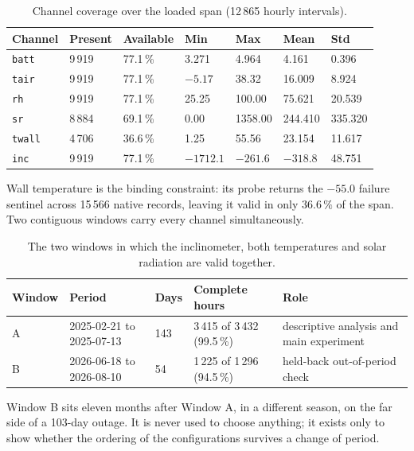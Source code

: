 \documentclass[11pt,a4paper]{article}
\begin{document}
\begin{table}[H]
\centering
\caption{Channel coverage over the loaded span (12\,865 hourly intervals).}
\begin{tabular}{@{}l R{1.9cm} R{2.0cm} R{1.9cm} R{1.8cm} R{1.8cm} R{1.8cm}@{}}
\toprule
\textbf{Channel} & \textbf{Present} & \textbf{Available} & \textbf{Min} & \textbf{Max}
& \textbf{Mean} & \textbf{Std}\\
\midrule
\texttt{batt}  & 9\,919 & 77.1\,\% & 3.271 & 4.964 & 4.161 & 0.396\\
\texttt{tair}  & 9\,919 & 77.1\,\% & $-5.17$ & 38.32 & 16.009 & 8.924\\
\texttt{rh}    & 9\,919 & 77.1\,\% & 25.25 & 100.00 & 75.621 & 20.539\\
\texttt{sr}    & 8\,884 & 69.1\,\% & 0.00 & 1358.00 & 244.410 & 335.320\\
\texttt{twall} & 4\,706 & 36.6\,\% & 1.25 & 55.56 & 23.154 & 11.617\\
\texttt{inc}   & 9\,919 & 77.1\,\% & $-1712.1$ & $-261.6$ & $-318.8$ & 48.751\\
\bottomrule
\end{tabular}
\end{table}

Wall temperature is the binding constraint: its probe returns the $-55.0$ failure
sentinel across 15\,566 native records, leaving it valid in only $36.6\,\%$ of the
span. Two contiguous windows carry every channel simultaneously.

\begin{table}[H]
\centering
\caption{The two windows in which the inclinometer, both temperatures and solar
radiation are valid together.}
\small
\begin{tabular}{@{}l l R{1.4cm} R{2.8cm} L{5.0cm}@{}}
\toprule
\textbf{Window} & \textbf{Period} & \textbf{Days} & \textbf{Complete hours} &
\textbf{Role}\\
\midrule
A & 2025-02-21 to 2025-07-13 & 143 & 3\,415 of 3\,432 (99.5\,\%) & descriptive analysis and main experiment\\
B & 2026-06-18 to 2026-08-10 &  54 & 1\,225 of 1\,296 (94.5\,\%) & held-back out-of-period check\\
\bottomrule
\end{tabular}
\end{table}

Window B sits eleven months after Window A, in a different season, on the far side of a
103-day outage. It is never used to choose anything; it exists only to show whether the
ordering of the configurations survives a change of period.
\end{document}
